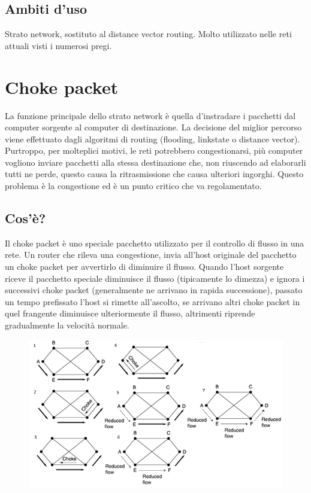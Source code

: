 \subsection{Ambiti d'uso}
Strato network, sostituto al distance vector routing.
Molto utilizzato nelle reti attuali visti i numerosi pregi.

\section{Choke packet}

La funzione principale dello strato network è quella d'instradare i pacchetti dal computer sorgente al computer di destinazione. La decisione del miglior percorso viene effettuato dagli algoritmi di routing (flooding, linkstate o distance vector). Purtroppo, per molteplici motivi, le reti potrebbero congestionarsi, più computer vogliono inviare pacchetti alla stessa destinazione che, non riuscendo ad elaborarli tutti ne perde, questo causa la ritrasmissione che causa ulteriori ingorghi. Questo problema è la congestione ed è un punto critico che va regolamentato.
\subsection{Cos'è?}
Il choke packet è uno speciale pacchetto utilizzato per il controllo di flusso in una rete. Un router che rileva una congestione, invia all'host originale del pacchetto un choke packet per avvertirlo di diminuire il flusso. Quando l'host sorgente riceve il pacchetto speciale diminuisce il flusso (tipicamente lo dimezza) e ignora i successivi choke packet (generalmente ne arrivano in rapida successione), passato un tempo prefissato l'host si rimette all'ascolto, se arrivano altri choke packet in quel frangente diminuisce ulteriormente il flusso, altrimenti riprende gradualmente la velocità normale.

\begin{figure}[H]
\centering
\includegraphics[scale=0.6]{res/img/35_ChokePacket.png}
\end{figure}
